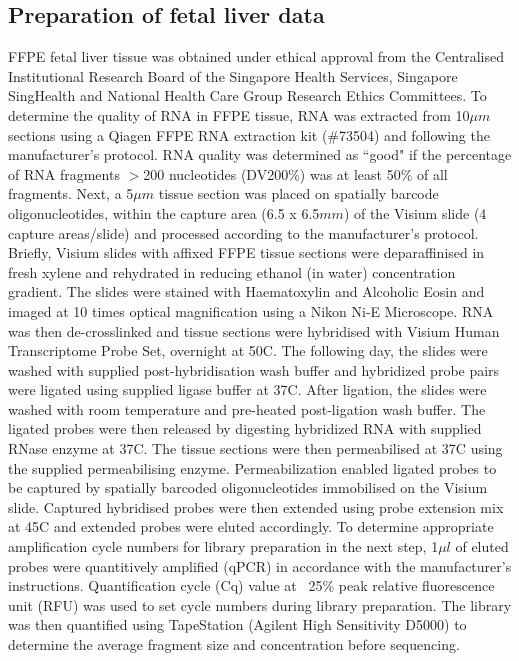\subsection*{Preparation of fetal liver data}
FFPE fetal liver tissue was obtained under ethical approval from the Centralised Institutional Research Board of the Singapore Health Services, Singapore SingHealth and National Health Care Group Research Ethics Committees. To determine the quality of RNA in FFPE tissue, RNA was extracted from 10$\mu m$ sections using a Qiagen FFPE RNA extraction kit (\#73504) and following the manufacturer's protocol. RNA quality was determined as ``good" if the percentage of RNA fragments $>$200 nucleotides (DV200\%) was at least 50\% of all fragments. Next, a 5$\mu m$ tissue section was placed on spatially barcode oligonucleotides, within the capture area (6.5 x 6.5$mm$) of the Visium slide (4 capture areas/slide) and processed according to the manufacturer's protocol. Briefly, Visium slides with affixed FFPE tissue sections were deparaffinised in fresh xylene and rehydrated in reducing ethanol (in water) concentration gradient. The slides were stained with Haematoxylin and Alcoholic Eosin and imaged at 10 times optical magnification using a Nikon Ni-E Microscope. RNA was then de-crosslinked and tissue sections were hybridised with Visium Human Transcriptome Probe Set, overnight at 50\textdegree C. The following day, the slides were washed with supplied post-hybridisation wash buffer and hybridized probe pairs were ligated using supplied ligase buffer at 37\textdegree C. After ligation, the slides were washed with room temperature and pre-heated post-ligation wash buffer. The ligated probes were then released by digesting hybridized RNA with supplied RNase enzyme at 37\textdegree C. The tissue sections were then permeabilised at 37\textdegree C using the supplied permeabilising enzyme. Permeabilization enabled ligated probes to be captured by spatially barcoded oligonucleotides immobilised on the Visium slide. Captured hybridised probes were then extended using probe extension mix at 45\textdegree C and extended probes were eluted accordingly. To determine appropriate amplification cycle numbers for library preparation in the next step, 1$\mu l$ of eluted probes were quantitively amplified (qPCR) in accordance with the manufacturer's instructions. Quantification cycle (Cq) value at ~25\% peak relative fluorescence unit (RFU) was used to set cycle numbers during library preparation. The library was then quantified using TapeStation (Agilent High Sensitivity D5000) to determine the average fragment size and concentration before sequencing.

